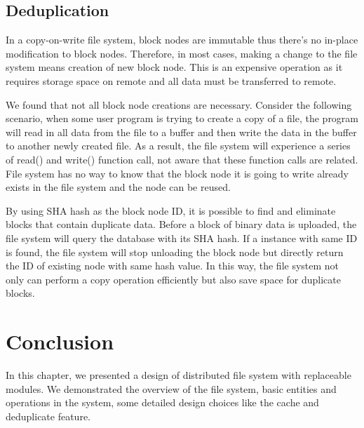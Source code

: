 \subsection{Deduplication}

    In a copy-on-write file system, block nodes are immutable thus there's no in-place modification to block nodes. Therefore, in most cases, making a change to the file system means creation of new block node. This is an expensive operation as it requires storage space on remote and all data must be transferred to remote.
    
    We found that not all block node creations are necessary. Consider the following scenario, when some user program is trying to create a copy of a file, the program will read in all data from the file to a buffer and then write the data in the buffer to another newly created file. As a result, the file system will experience a series of read() and write() function call, not aware that these function calls are related. File system has no way to know that the block node it is going to write already exists in the file system and the node can be reused.

    By using SHA hash as the block node ID, it is possible to find and eliminate blocks that contain duplicate data. Before a block of binary data is uploaded, the file system will query the database with its SHA hash. If a instance with same ID is found, the file system will stop unloading the block node but directly return the ID of existing node with same hash value. In this way, the file system not only can perform a copy operation efficiently but also save space for duplicate blocks. 

\section{Conclusion}

    In this chapter, we presented a design of distributed file system with replaceable modules. We demonstrated the overview of the file system, basic entities and operations in the system, some detailed design choices like the cache and deduplicate feature.

